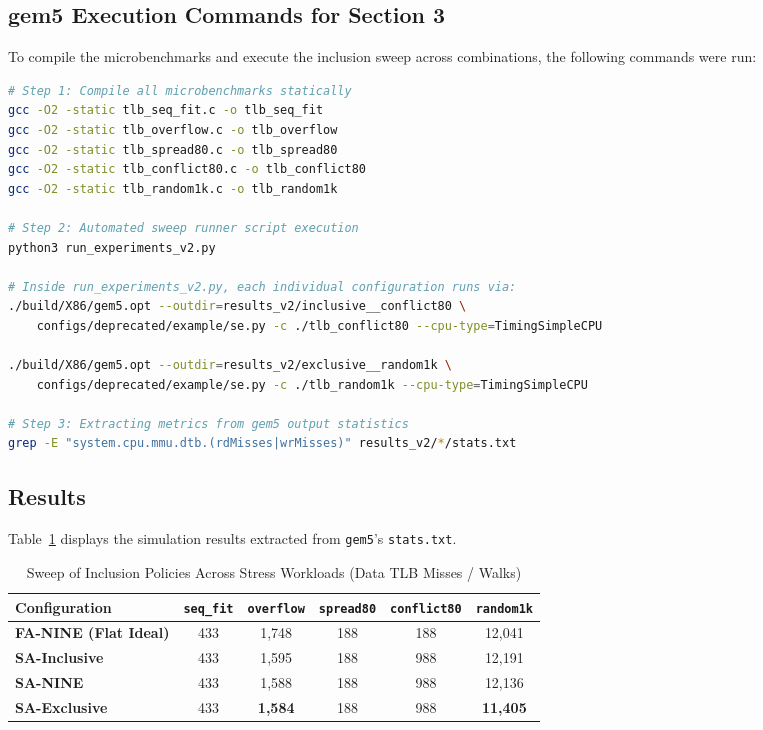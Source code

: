 \subsection{gem5 Execution Commands for Section 3}
To compile the microbenchmarks and execute the inclusion sweep across combinations, the following commands were run:

\begin{lstlisting}[language=bash,caption={Compilation and Execution Commands for Inclusion Policy Sweep in \texttt{gem5}},label={lst:cmd_inclusion}]
# Step 1: Compile all microbenchmarks statically
gcc -O2 -static tlb_seq_fit.c -o tlb_seq_fit
gcc -O2 -static tlb_overflow.c -o tlb_overflow
gcc -O2 -static tlb_spread80.c -o tlb_spread80
gcc -O2 -static tlb_conflict80.c -o tlb_conflict80
gcc -O2 -static tlb_random1k.c -o tlb_random1k

# Step 2: Automated sweep runner script execution
python3 run_experiments_v2.py

# Inside run_experiments_v2.py, each individual configuration runs via:
./build/X86/gem5.opt --outdir=results_v2/inclusive__conflict80 \
    configs/deprecated/example/se.py -c ./tlb_conflict80 --cpu-type=TimingSimpleCPU

./build/X86/gem5.opt --outdir=results_v2/exclusive__random1k \
    configs/deprecated/example/se.py -c ./tlb_random1k --cpu-type=TimingSimpleCPU

# Step 3: Extracting metrics from gem5 output statistics
grep -E "system.cpu.mmu.dtb.(rdMisses|wrMisses)" results_v2/*/stats.txt
\end{lstlisting}

\subsection{Results}
Table~\ref{tab:inclusion_sweep} displays the simulation results extracted from \texttt{gem5}'s \texttt{stats.txt}.

\begin{table}[H]
\centering
\small
\caption{Sweep of Inclusion Policies Across Stress Workloads (Data TLB Misses / Walks)}
\label{tab:inclusion_sweep}
\begin{tabularx}{\textwidth}{lccccc}
\toprule
\textbf{Configuration} & \textbf{\texttt{seq\_fit}} & \textbf{\texttt{overflow}} & \textbf{\texttt{spread80}} & \textbf{\texttt{conflict80}} & \textbf{\texttt{random1k}} \\
\midrule
\textbf{FA-NINE (Flat Ideal)} & 433 & 1,748 & 188 & 188 & 12,041 \\
\textbf{SA-Inclusive} & 433 & 1,595 & 188 & 988 & 12,191 \\
\textbf{SA-NINE} & 433 & 1,588 & 188 & 988 & 12,136 \\
\textbf{SA-Exclusive} & 433 & \textbf{1,584} & 188 & 988 & \textbf{11,405} \\
\bottomrule
\end{tabularx}
\end{table}

